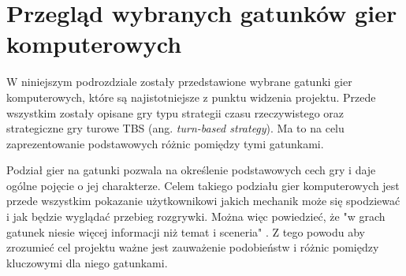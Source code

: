 \section{Przegląd wybranych gatunków gier komputerowych}
W niniejszym podrozdziale zostały przedstawione wybrane gatunki gier komputerowych, które są najistotniejsze z punktu widzenia
projektu. Przede wszystkim zostały opisane gry typu strategii czasu rzeczywistego oraz strategiczne gry turowe TBS (ang.
\textit{turn-based strategy}). Ma to na celu zaprezentowanie podstawowych różnic pomiędzy tymi gatunkami.

Podział gier na gatunki pozwala na określenie podstawowych cech gry i daje ogólne pojęcie o jej charakterze. Celem takiego
podziału gier komputerowych jest przede wszystkim pokazanie użytkownikowi jakich mechanik może się spodziewać i jak będzie
wyglądać przebieg rozgrywki. Można więc powiedzieć, że "w grach gatunek niesie więcej informacji niż temat i sceneria" \cite{practical_game_design}.
Z tego powodu aby zrozumieć cel projektu ważne jest zauważenie podobieństw i różnic pomiędzy kluczowymi dla niego gatunkami.





